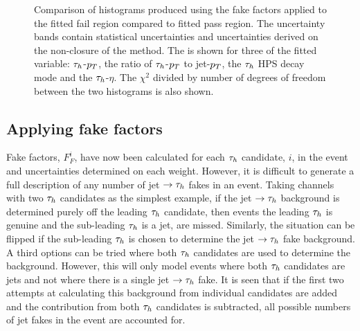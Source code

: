 \begin{figure}[!hbtp]
\caption{Comparison of histograms produced using the fake factors applied to the fitted fail region compared to fitted pass region. The uncertainty bands contain statistical uncertainties and uncertainties derived on the non-closure of the method. The is shown for three of the fitted variable: $\tau_{h}$-$p_{T}$, the ratio of $\tau_{h}$-$p_{T}$ to jet-$p_{T}$, the $\tau_{h}$ HPS decay mode and the $\tau_{h}$-$\eta$. The $\chi^2$ divided by number of degrees of freedom between the two histograms is also shown.}
\label{fig:4tau_ff_closure}
\end{figure}

\subsection{Applying fake factors}

Fake factors, $F_{F}^{i}$, have now been calculated for each $\tau_{h}$ candidate, $i$, in the event and uncertainties determined on each weight. 
However, it is difficult to generate a full description of any number of jet $\rightarrow \tau_{h}$ fakes in an event.
Taking channels with two $\tau_{h}$ candidates as the simplest example, if the jet $\rightarrow \tau_{h}$ background is determined purely off the leading $\tau_{h}$ candidate, then events the leading $\tau_{h}$ is genuine and the sub-leading $\tau_{h}$ is a jet, are missed.
Similarly, the situation can be flipped if the sub-leading $\tau_{h}$ is chosen to determine the jet $\rightarrow \tau_{h}$ fake background.
A third options can be tried where both $\tau_{h}$ candidates are used to determine the background.
However, this will only model events where both $\tau_{h}$ candidates are jets and not where there is a single jet $\rightarrow \tau_{h}$ fake. 
It is seen that if the first two attempts at calculating this background from individual candidates are added and the contribution from both $\tau_{h}$ candidates is subtracted, all possible numbers of jet fakes in the event are accounted for. \\


